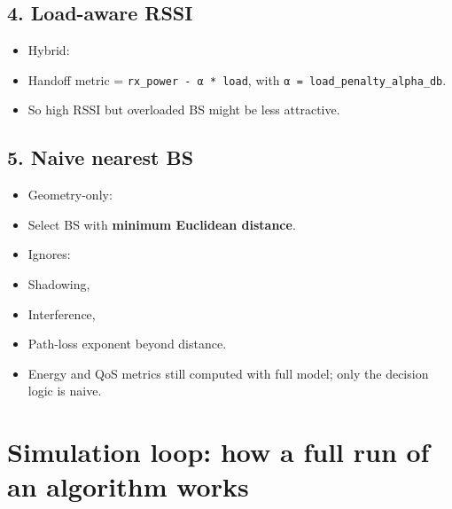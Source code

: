\documentclass[conference]{IEEEtran}
\begin{document}
\subsection{4. Load-aware RSSI}
\begin{itemize}
\item Hybrid:
\item Handoff metric = \texttt{rx\_power - α * load}, with \texttt{α = load\_penalty\_alpha\_db}.
\item So high RSSI but overloaded BS might be less attractive.
\end{itemize}


\subsection{5. Naive nearest BS}
\begin{itemize}
\item Geometry-only:
\item Select BS with \textbf{minimum Euclidean distance}.
\item Ignores:
\item Shadowing,
\item Interference,
\item Path-loss exponent beyond distance.
\item Energy and QoS metrics still computed with full model; only the decision logic is naive.
\end{itemize}



\section{Simulation loop: how a full run of an algorithm works}
\end{document}
